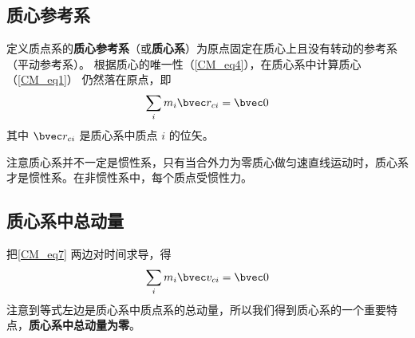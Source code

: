 \subsection{质心参考系}
定义质点系的\textbf{质心参考系}（或\textbf{质心系}）为原点固定在质心上且没有转动的参考系（平动参考系）。%
根据质心的唯一性（\autoref{CM_eq4}），在质心系中计算质心（\autoref{CM_eq1}） 仍然落在原点，即
\begin{equation}\label{CM_eq7}
\sum_i m_i \bvec r_{ci} = \bvec 0
\end{equation}
其中 $\bvec r_{ci}$ 是质心系中质点 $i$ 的位矢。

注意质心系并不一定是惯性系，只有当合外力为零质心做匀速直线运动时，质心系才是惯性系。在非惯性系中，每个质点受惯性力。

\subsection{质心系中总动量}
把\autoref{CM_eq7} 两边对时间求导，得
\begin{equation}\label{CM_eq8}
\sum_i m_i \bvec v_{ci} = \bvec 0
\end{equation}
注意到等式左边是质心系中质点系的总动量，所以我们得到质心系的一个重要特点，\textbf{质心系中总动量为零}。
